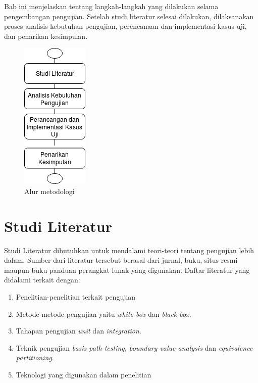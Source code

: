

Bab ini menjelaskan tentang langkah-langkah yang dilakukan selama
pengembangan pengujian. Setelah studi literatur selesai dilakukan,
dilaksanakan proses analisis kebutuhan pengujian, perencanaan dan
implementasi kasus uji, dan penarikan kesimpulan.

\begin{figure}[H]
  \centering
  \includegraphics[width=.2\linewidth]{img/diagram-uji3}
  \caption{Alur metodologi}
  \label{fig:alur-metodologi}
\end{figure}

\section{Studi Literatur}

Studi Literatur dibutuhkan untuk mendalami teori-teori tentang
pengujian lebih dalam. Sumber dari literatur tersebut berasal dari
jurnal, buku, situs resmi maupun buku panduan perangkat lunak
yang digunakan. Daftar literatur yang didalami terkait dengan:

\begin{enumerate}
\item Penelitian-penelitian terkait pengujian
\item Metode-metode pengujian yaitu \emph{white-box} dan \emph{black-box}.
\item Tahapan pengujian \emph{unit} dan \emph{integration}.
\item Teknik pengujian \emph{basis path testing, boundary value
    analysis} dan \emph{ equivalence partitioning}.
\item Teknologi yang digunakan dalam penelitian
\end{enumerate}

